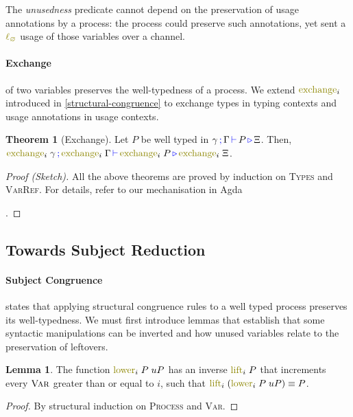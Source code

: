 \documentclass[sigplan,10pt,anonymous,review]{acmart}
\theoremstyle{definition}
\newtheorem{nitheorem}{Theorem}
\newtheorem{nilemma}{Lemma}
\newcommand{\type}[1]{\textcolor{blue}{\operatorname{#1}}}
\newcommand{\func}[1]{\textcolor{olive}{\operatorname{#1}}}
\newcommand{\lz}{\func{\ell_{\varnothing}}}
\newcommand{\types}[4]{#1 \, \type{;} \, #2 \, \type{\vdash} \, #3 \, \type{\triangleright} \, #4}
\begin{document}
  The \emph{unusedness} predicate cannot depend on the preservation of usage annotations by a process: the process could preserve such annotations, yet sent a $\lz$ usage of those variables over a channel.

\paragraph*{Exchange}
of two variables preserves the well-typedness of a process.
We extend $\func{exchange}_i$  introduced in \autoref{structural-congruence} to exchange types in typing contexts and usage annotations in usage contexts.
\begin{nitheorem}[Exchange]
  \label{thm:exchange}
  Let $P$ be well typed in $\types{\gamma}{\Gamma}{P}{\Xi}$.
  Then, $\types{\func{exchange}_i \; \gamma}{\func{exchange}_i \; \Gamma}{\allowbreak \func{exchange}_i \; P}{\func{exchange}_i \; \Xi}$.
\end{nitheorem}

\begin{proof}[Proof (Sketch)]
  All the above theorems are proved by induction on \textsc{Types} and \textsc{VarRef}.
  For details, refer to our mechanisation in Agda%
\begin{anonsuppress}
\cite{Zalakain2020Agda}
\end{anonsuppress}
.
\end{proof}

\subsection{Towards Subject Reduction}
\paragraph*{Subject Congruence}
states that applying structural congruence rules to a well typed process preserves its well-typedness.
We must first introduce lemmas that establish that some syntactic manipulations can be inverted and how unused variables relate to the preservation of leftovers.

\begin{nilemma}
  \label{lm:lower-lift}
  The function $\func{lower}_i \; P \; uP$ has an inverse $\func{lift}_i \; P$ that increments every $\textsc{Var}$ greater than or equal to $i$, such that $\func{lift}_i \; (\func{lower}_i \; P \; uP) \equiv P$.
\end{nilemma}
\begin{proof}
  By structural induction on \textsc{Process} and \textsc{Var}.
\end{proof}
\end{document}
